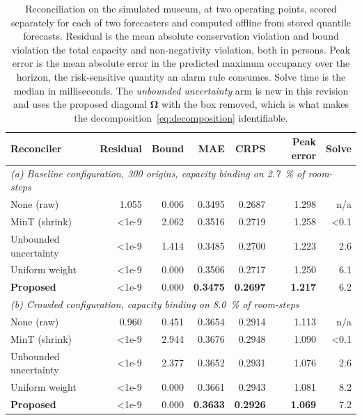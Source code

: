 \documentclass[11pt]{article}
\theoremstyle{plain}
\theoremstyle{definition}
\theoremstyle{remark}
\newcommand{\bOm}{\bm{\Omega}}
\newcommand{\best}[1]{\textbf{#1}}
\newif\ifrevisionmarkup
\newcommand{\new}[1]{\ifrevisionmarkup\textcolor{revision}{#1}\else#1\fi}
\begin{document}
\begin{table}[htbp]
\centering
\caption{Reconciliation on the simulated museum, \new{at two operating points}, scored separately for each of two forecasters and computed offline from stored quantile forecasts. Residual is the mean absolute conservation violation and bound violation the total capacity and non-negativity violation, both in persons. \new{Peak error is the mean absolute error in the predicted maximum occupancy over the horizon, the risk-sensitive quantity an alarm rule consumes.} Solve time is the median in milliseconds. \new{The \emph{unbounded uncertainty} arm is new in this revision and uses the proposed diagonal $\bOm$ with the box removed, which is what makes the decomposition~\eqref{eq:decomposition} identifiable.}}
\label{tab:recon}
\footnotesize
\setlength{\tabcolsep}{5pt}
\begin{tabular}{lrrrrrr}
\toprule
Reconciler & Residual & Bound & MAE & CRPS & \new{Peak error} & Solve \\
\midrule
\multicolumn{7}{l}{\emph{\new{(a) Baseline configuration, \num{300} origins, capacity binding on \SI{2.7}{\percent} of room-steps}}}\\
None (raw)              & \num{1.055} & \num{0.006} & 0.3495 & 0.2687 & 1.298 & n/a \\
MinT (shrink)           & \num{<1e-9} & \num{2.062} & 0.3516 & 0.2719 & 1.258 & \num{<0.1} \\
\new{Unbounded uncertainty} & \num{<1e-9} & \num{1.414} & 0.3485 & 0.2700 & 1.223 & 2.6 \\
Uniform weight          & \num{<1e-9} & \num{0.000} & 0.3506 & 0.2717 & 1.250 & 6.1 \\
\textbf{Proposed}       & \num{<1e-9} & \num{0.000} & \best{0.3475} & \best{0.2697} & \best{1.217} & 6.2 \\
\midrule
\multicolumn{7}{l}{\emph{\new{(b) Crowded configuration, capacity binding on \SI{8.0}{\percent} of room-steps}}}\\
None (raw)              & \num{0.960} & \num{0.451} & 0.3654 & 0.2914 & 1.113 & n/a \\
MinT (shrink)           & \num{<1e-9} & \num{2.944} & 0.3676 & 0.2948 & 1.090 & \num{<0.1} \\
\new{Unbounded uncertainty} & \num{<1e-9} & \num{2.377} & 0.3652 & 0.2931 & 1.076 & 2.6 \\
Uniform weight          & \num{<1e-9} & \num{0.000} & 0.3661 & 0.2943 & 1.081 & 8.2 \\
\textbf{Proposed}       & \num{<1e-9} & \num{0.000} & \best{0.3633} & \best{0.2926} & \best{1.069} & 7.2 \\
\bottomrule
\end{tabular}
\end{table}
\end{document}
